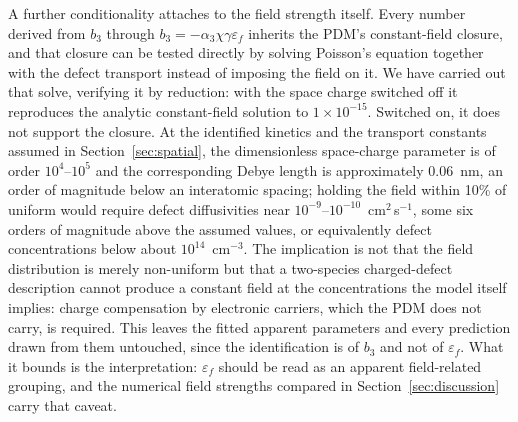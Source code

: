 \documentclass[preprint,12pt]{elsarticle}
\begin{document}
A further conditionality attaches to the field strength itself. Every
number derived from $b_3$ through
$b_3 = -\alpha_3\chi\gamma\varepsilon_f$ inherits the PDM's constant-field
closure, and that closure can be tested directly by solving Poisson's
equation together with the defect transport instead of imposing the
field on it. We have carried out that solve, verifying it by reduction:
with the space charge switched off it reproduces the analytic
constant-field solution to $1\times10^{-15}$. Switched on, it does not
support the closure. At the identified kinetics and the transport
constants assumed in Section~\ref{sec:spatial}, the dimensionless
space-charge parameter is of order $10^{4}$--$10^{5}$ and the
corresponding Debye length is approximately 0.06~nm, an order of
magnitude below an interatomic spacing; holding the field within 10\% of
uniform would require defect diffusivities near
$10^{-9}$--$10^{-10}$~cm$^2$\,s$^{-1}$, some six orders of magnitude
above the assumed values, or equivalently defect concentrations below
about $10^{14}$~cm$^{-3}$. The implication is not that the field
distribution is merely non-uniform but that a two-species charged-defect
description cannot produce a constant field at the concentrations the
model itself implies: charge compensation by electronic carriers, which
the PDM does not carry, is required. This leaves the fitted apparent
parameters and every prediction drawn from them untouched, since the
identification is of $b_3$ and not of $\varepsilon_f$. What it bounds is
the interpretation: $\varepsilon_f$ should be read as an apparent
field-related grouping, and the numerical field strengths compared in
Section~\ref{sec:discussion} carry that caveat.
\end{document}
